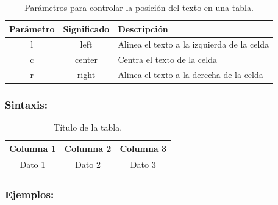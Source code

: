 \documentclass{book}
\begin{document}
\begin{table}[h]
    \centering
    \begin{tabular}{c|c|l}
        \hline
        Parámetro & Significado & Descripción\\
        \hline
        l & left & Alinea el texto a la izquierda de la celda \\
        \hline
        c & center & Centra el texto de la celda\\
        \hline
        r & right & Alinea el texto a la derecha de la celda\\
        \hline
    \end{tabular}
    \caption{Parámetros para controlar la posición del texto en una tabla.}
    \label{tabla:parametros_tabla}
\end{table}

\subsubsection*{Sintaxis:}
\begin{codigo}
\begin{LTXexample}[numbers=none]
    \begin{table}[placement]
        \centering
        \begin{tabular}{|c|c|c|}
        \hline
        Columna 1 & Columna 2 & Columna 3 \\ \hline
        Dato 1 & Dato 2 & Dato 3 \\ \hline
    \end{tabular}
    \caption{Título de la tabla.}
    \label{unatabla}
    \end{table}
\end{LTXexample}
\label{sintaxis:table}
\end{codigo}

\subsubsection*{Ejemplos:}
\end{document}
